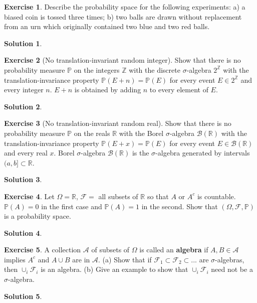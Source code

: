 \documentclass[12pt]{article}
\newcommand{\Prob}{\mathbb{P}}
\theoremstyle{definition}
\newtheorem{exer}{Exercise}
\newtheorem{sol}{Solution}
\theoremstyle{remark}
\begin{document}
\begin{exer}
Describe the probability space for the following experiments: a) a biased coin is tossed three times; b)  two balls are drawn without replacement from an urn which originally contained two blue and two red balls.
\end{exer}

\begin{sol}

\end{sol}

\begin{exer}[No translation-invariant random integer]
Show that there is no probability measure $\Prob$ on the integers $\mathbb{Z}$ with the discrete
$\sigma$-algebra $2^{\mathbb{Z}}$ with the translation-invariance property $\Prob(E + n) = \Prob(E)$ for every event $E \in 2^{\mathbb{Z}}$ and every integer $n$. $E+n$ is obtained by adding $n$ to every element of $E$.
\end{exer}
\begin{sol}

\end{sol}
\begin{exer}[No translation-invariant random real]
 Show that there is no probability measure $\Prob$ on the reals $\mathbb{R}$ with the Borel
$\sigma$-algebra $\mathcal{B}(\mathbb{R})$ with the translation-invariance property $\Prob(E + x) = \Prob(E)$ for every event $E \in \mathcal{B}(\mathbb{R})$ and every real $x$. Borel $\sigma$-algebra $\mathcal{B}(\mathbb{R})$ is the $\sigma$-algebra generated by intervals $(a,b] \subset \mathbb{R}$.
\end{exer}
\begin{sol}

\end{sol}
\begin{exer}
Let $\Omega=\mathbb{R}$, $\mathcal{F}=$ all subsets of $\mathbb{R}$ so that $A$ or $A^c$ is countable. $\Prob(A)=0$ in the first case and $\Prob(A)=1$ in the second. Show that $(\Omega, \mathcal{F}, \Prob)$ is a probability space.
\end{exer}
\begin{sol}

\end{sol}
\begin{exer}
A collection $\mathcal{A}$ of subsets of $\Omega$ is called an {\bf algebra} if $A,B \in \mathcal{A}$ implies $A^c$ and $A\cup B$ are in  $\mathcal{A}$. (a) Show that if $\mathcal{F}_1 \subset \mathcal{F}_2 \subset ...$ are $\sigma$-algebras, then $\cup_i \mathcal{F}_i$ is an algebra. (b) Give an example to show that $\cup_i \mathcal{F}_i$ need not be a $\sigma$-algebra.
\end{exer}
\begin{sol}

\end{sol}
\end{document}
